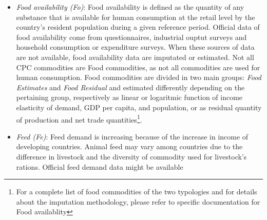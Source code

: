 \documentclass[]{article}
\let\rmarkdownfootnote\footnote%
\def\footnote{\protect\rmarkdownfootnote}
\begin{document}
\begin{itemize}
  considered as a utilization for that commodity. Changes in stocks are
  tipically limited to a short number of commodities, mainly grains,
  pulses and sugar and, because they are very rarely measured by
  country, figures are very often imputed or estimated\footnote{For a
    complete list of stock commodities and for details about the
    imputation methodology, please refer to specific documentation for
    stock}. Estimation of \emph{changes in stock} is based on opening
  stocks figures throught an approach that mantain time consistency of
  available data and official data\footnote{All data are marked as
    \emph{official}, \emph{semi-official} or \emph{unofficial},
    depending on the source they come from, throught \emph{flags}. Flag
    management is one of the core responsibilities of the \emph{Office
    of the Chief Statistician} Department in FAO. Flags are used from
    all the estimation procedure for distinguishing between different
    level of reliability in the data. The most reliable data are used to
    estimate missing or less reliable data.{[}this has to be better
    specified{]}}.
\item
  \emph{Food availability (Fo)}: Food availability is defined as the
  quantity of any substance that is available for human consumption at
  the retail level by the country's resident population during a given
  reference period. Official data of food availability come from
  questionnaires, industrial ouptut surveys and household consumption or
  expenditure surveys. When these sources of data are not available,
  food availability data are imputated or estimated. Not all CPC
  commodities are Food commodities, as not all commodities are used for
  human consumption. Food commodities are divided in two main groups:
  \emph{Food Estimates} and \emph{Food Residual} and estimated
  differently depending on the pertaining group, respectively as linear
  or logaritmic function of income elasticity of demand, GDP per capita,
  and population, or as residual quantity of production and net trade
  quantities\footnote{For a complete list of food commodities of the two
    typologies and for details about the imputation methodology, please
    refer to specific documentation for Food availablity}.
\item
  \emph{Feed (Fe)}: Feed demand is increasing because of the increase in
  income of developing countries. Animal feed may vary among countries
  due to the difference in livestock and the diversity of commodity used
  for livestock's rations. Official feed demand data might be available

\end{itemize}
\end{document}

